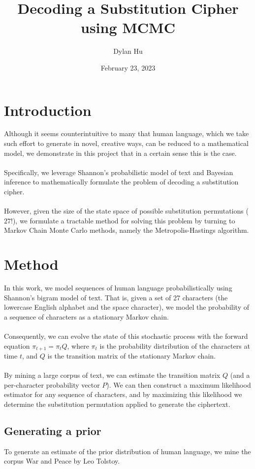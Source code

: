 \documentclass[11pt]{article}
\title{Decoding a Substitution Cipher using MCMC}
\author{Dylan Hu}
\date{February 23, 2023}
\begin{document}
\maketitle
\tableofcontents

\section{Introduction}
Although it seems counterintuitive to many that human language, which we take such effort to generate in novel, creative ways, can be reduced to a mathematical model, we demonstrate in this project that in a certain sense this is the case.
\\\\
Specifically, we leverage Shannon's probabilistic model of text and Bayesian inference to mathematically formulate the problem of decoding a substitution cipher.
\\\\
However, given the size of the state space of possible substitution permutations ($27!$), we formulate a tractable method for solving this problem by turning to Markov Chain Monte Carlo methods, namely the Metropolis-Hastings algorithm.

\pagebreak

\section{Method}
In this work, we model sequences of human language probabilistically using Shannon's bigram model of text. That is, given a set of 27 characters (the lowercase English alphabet and the space character), we model the probability of a sequence of characters as a stationary Markov chain.
\\\\
Consequently, we can evolve the state of this stochastic process with the forward equation $\pi_{t+1} = \pi_t Q$, where $\pi_t$ is the probability distribution of the characters at time $t$, and $Q$ is the transition matrix of the stationary Markov chain.
\\\\
By mining a large corpus of text, we can estimate the transition matrix $Q$ (and a per-character probability vector $P$). We can then construct a maximum likelihood estimator for any sequence of characters, and by maximizing this likelihood we determine the substitution permutation applied to generate the ciphertext.

\subsection{Generating a prior}
To generate an estimate of the prior distribution of human language, we mine the corpus War and Peace by Leo Tolstoy.
\end{document}
